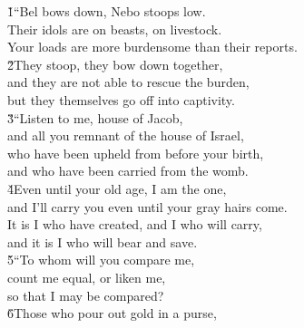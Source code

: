 \begin{poetry}
\poeml {}
\v{1}``Bel bows down, Nebo stoops low. \\
\poemll    Their idols are on beasts, on livestock. \\
\poemlll       Your loads are more burdensome than their reports. \\
\poeml \v{2}They stoop, they bow down together, \\
\poemll    and they are not able to rescue the burden, \\
\poemlll       but they themselves go off into captivity. \\
\poeml \v{3}``Listen to me, house of Jacob, \\
\poemll    and all you remnant of the house of Israel, \\
\poeml who have been upheld from before your birth, \\
\poemll    and who have been carried from the womb. \\
\poeml \v{4}Even until your old age, I am the one, \\
\poemll    and I'll carry you even until your gray hairs come. \\
\poeml It is I who have created, and I who will carry, \\
\poemll    and it is I who will bear and save. \\
\poeml \v{5}``To whom will you compare me, \\
\poemll    count me equal, or liken me, \\
\poemlll       so that I may be compared? \\
\poeml \v{6}Those who pour out gold in a purse, \\

\end{poetry}
